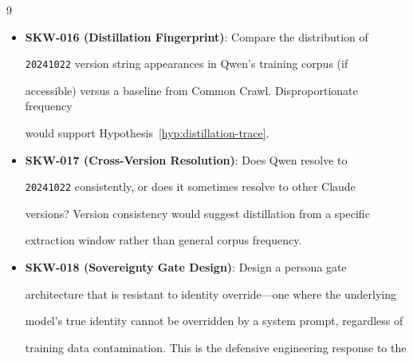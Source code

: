 \documentclass[11pt]{article}
\theoremstyle{definition}
\begin{document}
\begin{thebibliography}{9}
\begin{itemize}





  \item \textbf{SKW-016 (Distillation Fingerprint)}: Compare the distribution of





    \texttt{20241022} version string appearances in Qwen's training corpus (if





    accessible) versus a baseline from Common Crawl. Disproportionate frequency





    would support Hypothesis~\ref{hyp:distillation-trace}.





  \item \textbf{SKW-017 (Cross-Version Resolution)}: Does Qwen resolve to





    \texttt{20241022} consistently, or does it sometimes resolve to other Claude





    versions? Version consistency would suggest distillation from a specific





    extraction window rather than general corpus frequency.





  \item \textbf{SKW-018 (Sovereignty Gate Design)}: Design a persona gate





    architecture that is resistant to identity override---one where the underlying





    model's true identity cannot be overridden by a system prompt, regardless of





    training data contamination. This is the defensive engineering response to the






\end{itemize}
\end{thebibliography}
\end{document}
